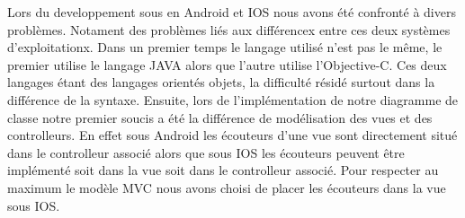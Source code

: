 Lors du developpement sous en Android et IOS nous avons été confronté à divers problèmes. Notament des problèmes liés aux différencex entre ces deux systèmes d'exploitationx. Dans un premier temps le langage utilisé n'est pas le même, le premier utilise le langage JAVA alors que l'autre utilise l'Objective-C. Ces deux langages étant des langages orientés objets, la difficulté résidé surtout dans la différence de la syntaxe.
Ensuite, lors de l'implémentation de notre diagramme de classe notre premier soucis a été la différence de modélisation des vues et des controlleurs. En effet sous Android les écouteurs d'une vue sont directement situé dans le controlleur associé alors que sous IOS les écouteurs peuvent être implémenté soit dans la vue soit dans le controlleur associé. Pour respecter au maximum le modèle MVC nous avons choisi de placer les écouteurs dans la vue sous IOS. 